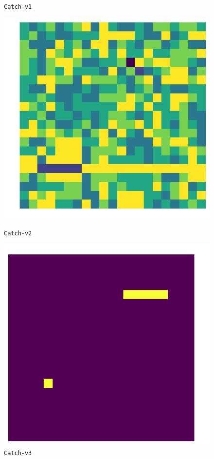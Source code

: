 \begin{figure}[ht]
\begin{minipage}[b]{0.35\linewidth}
\caption{\texttt{Catch-v1}}
\label{fig:fig2}
\end{minipage}
\hspace{0.5cm}
\begin{minipage}[b]{0.35\linewidth}
\centering
\includegraphics[width=\textwidth]{./Images/Chapter08/catch_v3}
\caption{\texttt{Catch-v2}}
\label{fig:fig3}
\end{minipage}
\hspace{0.5cm}
\begin{minipage}[b]{0.35\linewidth}
\centering
\includegraphics[width=\textwidth]{./Images/Chapter08/catch_v1}
\caption{\texttt{Catch-v3}}
\label{fig:fig4}
\end{minipage}
\end{figure}


